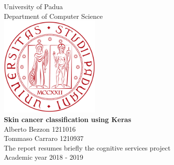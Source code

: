 \documentclass[11pt,oneside]{book}
\begin{document}
	
	
	\frontmatter
	
	\begin{titlepage}
		
		
		
		\begin{center}
			{\LARGE University of Padua}\\[1cm]
			{\Large Department of Computer Science}\\[2cm]
			\includegraphics[width=5cm]{images/logo-unipd.png}\\[2cm]
			\linespread{1.2}\huge {\bfseries Skin cancer classification using Keras}\\[1.5cm]
			\linespread{1}
			{\Large Alberto Bezzon 1211016 \\ Tommaso Carraro 1210937}\\[1cm]
			\large The report resumes briefly the cognitive services project\\[0.5cm] 
			Academic year 2018 - 2019
		\end{center}
		
	\end{titlepage}
	
	
	
	
	
	
	
\end{document}
